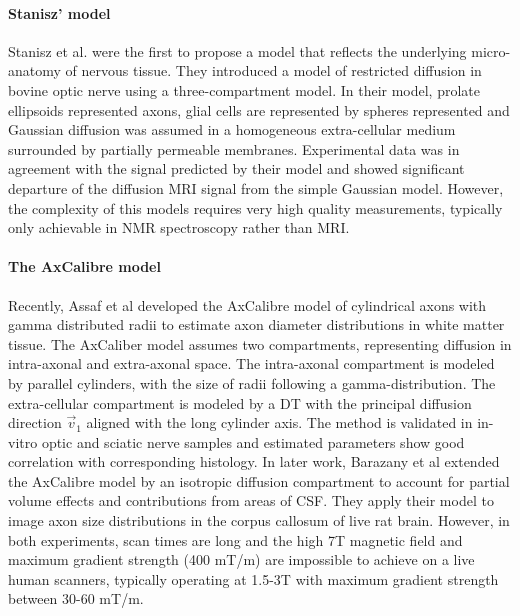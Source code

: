 \paragraph*{Stanisz' model}
Stanisz et al.\cite{stanisz90} were the first to propose a model that reflects the underlying micro-anatomy of nervous tissue. They introduced a model of restricted diffusion in bovine optic nerve using a three-compartment model. In their model, prolate ellipsoids represented axons, glial cells are represented by spheres represented and Gaussian diffusion was assumed in a homogeneous extra-cellular medium surrounded by partially permeable membranes. Experimental data was in agreement with the signal predicted by their model and showed significant departure of the diffusion MRI signal from the simple Gaussian model. However, the complexity of this models requires very high quality measurements, typically only achievable in NMR spectroscopy rather than MRI.
\paragraph*{The AxCalibre model}
Recently, Assaf et al\cite{assaf2008} developed the AxCalibre model of cylindrical axons with gamma distributed radii to estimate axon diameter distributions in white matter tissue. The AxCaliber model assumes two compartments, representing diffusion in intra-axonal and extra-axonal space. The intra-axonal compartment is modeled by parallel cylinders, with the size of radii following a gamma-distribution. The extra-cellular compartment is modeled by a DT with the principal diffusion direction $\vec{v}_1$ aligned with the long cylinder axis. The method is validated in in-vitro optic and sciatic nerve samples and estimated parameters show good correlation with corresponding histology. In later work, Barazany et al\cite{barazany2009} extended the AxCalibre model by an isotropic diffusion compartment to account for partial volume effects and contributions from areas of CSF. They apply their model to image axon size distributions in the corpus callosum of live rat brain. However, in both experiments, scan times are long and the high 7T magnetic field and maximum gradient strength (400 mT/m) are impossible to achieve on a live human scanners, typically operating at 1.5-3T with maximum gradient strength between 30-60 mT/m. 
